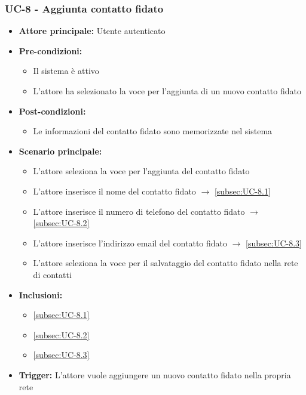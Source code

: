 \documentclass[a4paper,12pt]{article}
\begin{document}
\subsubsection{UC-8 - Aggiunta contatto fidato} \label{subsec:UC-8}
\begin{itemize}
    \item \textbf{Attore principale:} Utente autenticato
    \item \textbf{Pre-condizioni:} 
    \begin{itemize}
        \item Il sistema è attivo
        \item L'attore ha selezionato la voce per l'aggiunta di un nuovo contatto fidato
    \end{itemize}
    \item \textbf{Post-condizioni:}
    \begin{itemize}
        \item Le informazioni del contatto fidato sono memorizzate nel sistema
    \end{itemize}
    \item \textbf{Scenario principale:} 
    \begin{itemize}
        \item L'attore seleziona la voce per l'aggiunta del contatto fidato
        \item L'attore inserisce il nome del contatto fidato $\rightarrow$ \ref{subsec:UC-8.1}
        \item L'attore inserisce il numero di telefono del contatto fidato $\rightarrow$ \ref{subsec:UC-8.2}
        \item L'attore inserisce l'indirizzo email del contatto fidato $\rightarrow$ \ref{subsec:UC-8.3}
        \item L'attore seleziona la voce per il salvataggio del contatto fidato nella rete di contatti
    \end{itemize}
    \item \textbf{Inclusioni:}
    \begin{itemize}
        \item \ref{subsec:UC-8.1}
        \item \ref{subsec:UC-8.2}
        \item \ref{subsec:UC-8.3}
    \end{itemize}
    \item \textbf{Trigger:} L'attore vuole aggiungere un nuovo contatto fidato nella propria rete
\end{itemize}
\end{document}
